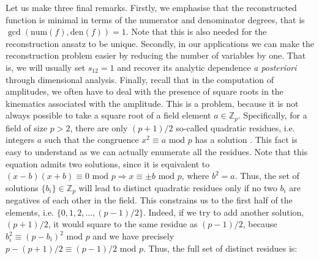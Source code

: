 \documentclass[main.tex]{subfiles}
\begin{document}
Let us make three final remarks. Firstly, we emphasise that the reconstructed function is minimal in terms of the numerator and denominator degrees, that is $\gcd \left(\text{num}(f), \text{den}(f) \right) = 1$. Note that this is also needed for the reconstruction ansatz to be unique.
Secondly, in our applications we can make the reconstruction problem easier by reducing the number of variables by one. That is, we will usually set $s_{12} = 1$ and recover its analytic dependence \textit{a posteriori} through dimensional analysis. Finally, recall that in the computation of amplitudes, we often have to deal with the presence of square roots in the kinematics associated with the amplitude. This is a problem, because it is not always possible to take a square root of a field element $a \in \mathbb{Z}_p$. Specifically, for a field of size $p>2$, there are only $(p+1)/2$ so-called quadratic residues, i.e. integers $a$ such that the congruence $x^2 \equiv a \text{ mod } p$ has a solution \cite{hardy2008introduction}. This fact is easy to understand as we can actually enumerate all the residues. Note that this equation admits two solutions, since it is equivalent to $(x-b)(x+b) \equiv 0 \text{ mod } p \Longrightarrow x \equiv \pm b \text{ mod } p$, where $b^2=a$. Thus, the set of solutions $\{b_i\} \in \mathbb{Z}_p$ will lead to distinct quadratic residues only if no two $b_i$ are negatives of each other in the field. This constrains us to the first half of the elements, i.e. $\{0, 1, 2, \ldots, (p-1)/2 \}$. Indeed, if we try to add another solution, $(p+1)/2$, it would square to the same residue as $(p-1)/2$, because $b_i^2 \equiv (p-b_i)^2 \text{ mod } p$ and we have precisely $p - (p+1)/2 \equiv (p-1)/2 \text{ mod } p$. Thus, the full set of distinct residues is:
\end{document}
